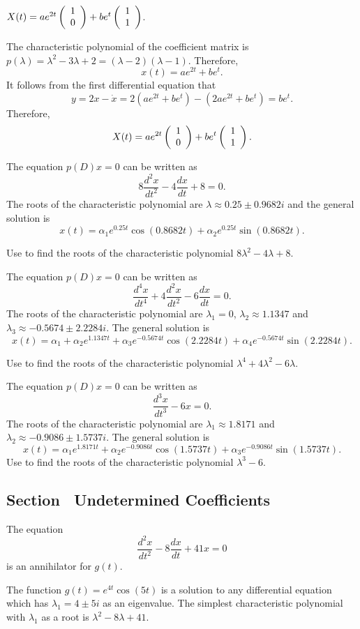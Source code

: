 \documentclass{ximera}
\begin{document}
 \ans $X(t) = ae^{2t}\left(\begin{array}{r} 1 \\ 0\end{array}\right) + be^t\left(\begin{array}{r} 1 \\ 1\end{array}\right)$.

\soln  The characteristic polynomial of the coefficient matrix is 
$p(\lambda) = \lambda^2-3\lambda+2=(\lambda-2)(\lambda-1)$.  Therefore, 
\[
x(t) = ae^{2t}+be^t.
\]
It follows from the first differential equation that 
\[
y = 2x-\dot{x} = 2(ae^{2t}+be^t)-(2ae^{2t}+be^t) = be^t.
\]
Therefore,
\[
X(t) = ae^{2t}\left(\begin{array}{r} 1 \\ 0\end{array}\right) + be^t\left(\begin{array}{r} 1 \\ 1\end{array}\right).
\]


 \ans The equation $p(D)x = 0$ can be written as
\[
8\frac{d^2x}{dt^2} - 4\frac{dx}{dt} + 8 = 0.
\]  
The roots of the characteristic polynomial are $\lambda \approx 0.25
\pm 0.9682i$ and the general solution is
\[
x(t) = \alpha_1e^{0.25t}\cos(0.8682t) +
\alpha_2e^{0.25t}\sin(0.8682t).
\]

\soln Use \Matlab to find the roots of the characteristic polynomial
$8\lambda^2 - 4\lambda + 8$.

 \ans The equation $p(D)x = 0$ can be written as
\[
\frac{d^4x}{dt^4} + 4\frac{d^2x}{dt^2} - 6\frac{dx}{dt} = 0.
\]
The roots of the characteristic polynomial are $\lambda_1 = 0$,
$\lambda_2 \approx 1.1347$ and $\lambda_3 \approx -0.5674 \pm 2.2284i$.
The general solution is
\[
x(t) = \alpha_1 + \alpha_2e^{1.1347t} + \alpha_3e^{-0.5674t}\cos(2.2284t) +
\alpha_4e^{-0.5674t}\sin(2.2284t).
\]

\soln Use \Matlab to find the roots of the characteristic polynomial
$\lambda^4 + 4\lambda^2 - 6\lambda$.

 \ans The equation $p(D)x = 0$ can be written as
\[
\frac{d^3x}{dt^3} - 6x = 0.
\]
The roots of the characteristic polynomial are $\lambda_1 \approx
1.8171$ and $\lambda_2 \approx -0.9086 \pm 1.5737i$.  The general
solution is
\[
x(t) = \alpha_1e^{1.8171t} + \alpha_2e^{-0.9086t}\cos(1.5737t) +
\alpha_3e^{-0.9086t}\sin(1.5737t).
\]
\soln Use \Matlab to find the roots of the characteristic polynomial
$\lambda^3 - 6$.



\subsection*{Section~\protect{\ref{sec:2norderinhom}} Undetermined Coefficients}

 \ans The equation
\[
\frac{d^2x}{dt^2} - 8\frac{dx}{dt} + 41x = 0
\]
is an annihilator for $g(t)$.

\soln The function $g(t) = e^{4t}\cos(5t)$ is a solution to any differential
equation which has $\lambda_1 = 4 \pm 5i$ as an eigenvalue.  The
simplest characteristic polynomial with $\lambda_1$ as a root is
$\lambda^2 - 8\lambda + 41$.
\end{document}
